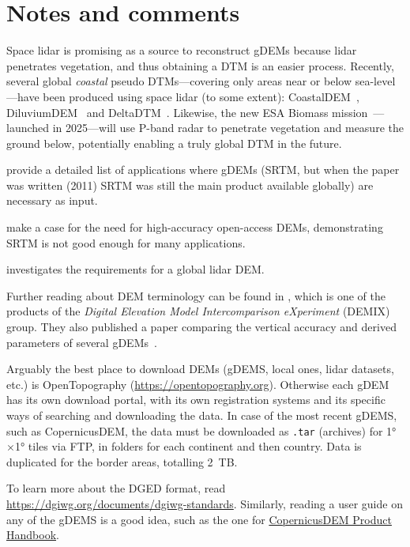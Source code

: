 %
\section{Notes and comments}

Space lidar is promising as a source to reconstruct gDEMs because lidar penetrates vegetation, and thus obtaining a DTM is an easier process.
Recently, several global \emph{coastal} pseudo DTMs---covering only areas near or below sea-level---have been produced using space lidar (to some extent): CoastalDEM~\citep{Kulp24}, DiluviumDEM~\citep{Dusseau23} and DeltaDTM~\citep{Pronk24}.
Likewise, the new ESA Biomass mission~\citep{queganEuropeanSpaceAgency2019}---launched in 2025---will use P-band radar to penetrate vegetation and measure the ground below, potentially enabling a truly global DTM in the future.

\citet{Yang11} provide a detailed list of applications where gDEMs (SRTM, but when the paper was written (2011) SRTM was still the main product available globally) are necessary as input.

\citet{Schumann2018} make a case for the need for high-accuracy open-access DEMs, demonstrating SRTM is not good enough for many applications.

\citet{Hancock2021} investigates the requirements for a global lidar DEM\@.

Further reading about DEM terminology can be found in \citet{Guth2021}, which is one of the products of the \emph{Digital Elevation Model Intercomparison eXperiment} (DEMIX) group.
They also published a paper comparing the vertical accuracy and derived parameters of several gDEMs~\citep{guthRanking10Global2024}.

Arguably the best place to download DEMs (gDEMS, local ones, lidar datasets, etc.) is OpenTopography (\url{https://opentopography.org}).
Otherwise each gDEM has its own download portal, with its own registration systems and its specific ways of searching and downloading the data.
In case of the most recent gDEMS, such as CopernicusDEM, the data must be downloaded as \texttt{.tar} (archives) for \ang{1}$\times$\ang{1} tiles via FTP, in folders for each continent and then country.
Data is duplicated for the border areas, totalling \qty{2}{TB}.

To learn more about the DGED format, read \url{https://dgiwg.org/documents/dgiwg-standards}.
Similarly, reading a user guide on any of the gDEMS is a good idea, such as the one for \href{https://spacedata.copernicus.eu/documents/20126/0/GEO1988-CopernicusDEM-SPE-002_ProductHandbook_I3.0+%281%29.pdf}{CopernicusDEM Product Handbook}.

